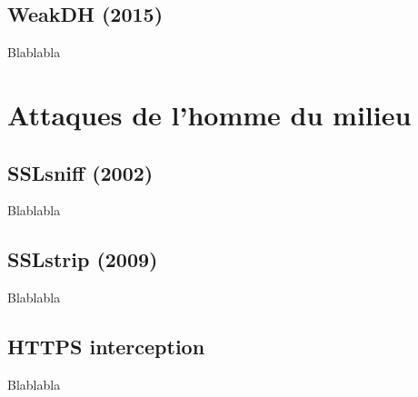 \subsection{WeakDH (2015)}

Blablabla \cite{weakdh}

\section{Attaques de l'homme du milieu}

\subsection{SSLsniff (2002)}

Blablabla \cite{sslsniff-website}

\subsection{SSLstrip (2009)}

Blablabla \cite{sslstrip-website}

\subsection{HTTPS interception}

Blablabla \cite{https-interception}
